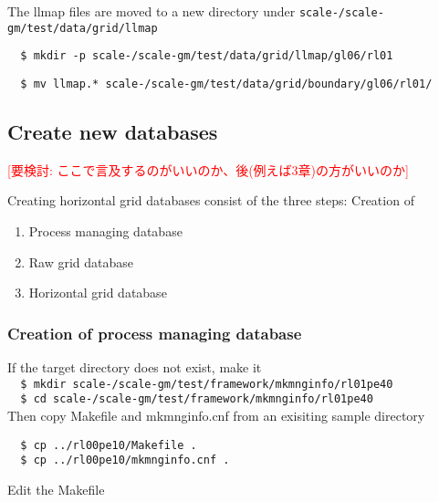 \noindent The llmap files are moved to a new directory under 
\texttt{scale-{\version}/scale-gm/test/data/grid/llmap}

\verb|  $ mkdir -p scale-|{\version}\verb|/scale-gm/test/data/grid/llmap/gl06/rl01|

\verb|  $ mv llmap.* scale-|{\version}\verb|/scale-gm/test/data/grid/boundary/gl06/rl01/| \\


\subsection{Create new databases}
\textcolor{red}{[要検討: ここで言及するのがいいのか、後(例えば3章)の方がいいのか]}

Creating horizontal grid databases consist of the three steps: Creation of 
\begin{enumerate}
  \item Process managing database
  \item Raw grid database
  \item Horizontal grid database
\end{enumerate}

\subsubsection{Creation of process managing database} 

If the target directory does not exist, make it \\

\verb|  $ mkdir scale-|{\version}\verb|/scale-gm/test/framework/mkmnginfo/rl01pe40| \\

\verb|  $ cd scale-|{\version}\verb|/scale-gm/test/framework/mkmnginfo/rl01pe40| \\

Then copy Makefile and mkmnginfo.cnf from an exisiting sample directory
\begin{verbatim}
  $ cp ../rl00pe10/Makefile .
  $ cp ../rl00pe10/mkmnginfo.cnf .
\end{verbatim}

Edit the Makefile


